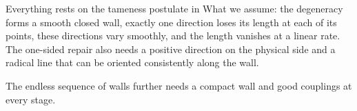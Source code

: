 \documentclass[11pt]{article}
\theoremstyle{definition}
\theoremstyle{plain}
\begin{document}
Everything rests on the tameness postulate in What we assume: the degeneracy forms a smooth closed wall, exactly one direction loses its length at each of its points, these directions vary smoothly, and the length vanishes at a linear rate. The one-sided repair also needs a positive direction on the physical side and a radical line that can be oriented consistently along the wall.

The endless sequence of walls further needs a compact wall and good couplings at every stage.
\end{document}
